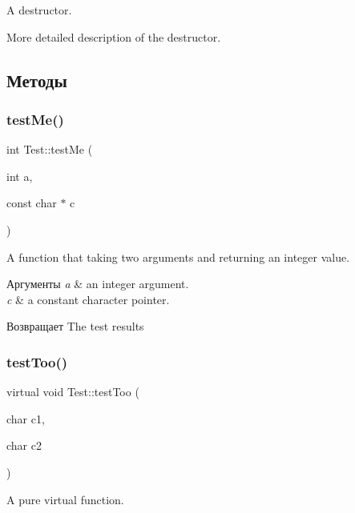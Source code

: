 A destructor. 

More detailed description of the destructor. 

\subsection{Методы}
\hypertarget{class_test_ae41a1e1bd9116e7b8f166500f6d6a38b}{}\label{class_test_ae41a1e1bd9116e7b8f166500f6d6a38b} 
\subsubsection{\texorpdfstring{test\+Me()}{testMe()}}
{\footnotesize\ttfamily int Test\+::test\+Me (\begin{DoxyParamCaption}\item[{int}]{a,  }\item[{const char $\ast$}]{c }\end{DoxyParamCaption})}



A function that taking two arguments and returning an integer value. 


\begin{DoxyParams}{Аргументы}
{\em a} & an integer argument. \\
\hline
{\em c} & a constant character pointer. \\
\hline
\end{DoxyParams}
\begin{DoxyReturn}{Возвращает}
The test results 
\end{DoxyReturn}
\hypertarget{class_test_aebeca5098345184f423cecb03d8cb615}{}\label{class_test_aebeca5098345184f423cecb03d8cb615} 
\subsubsection{\texorpdfstring{test\+Too()}{testToo()}}
{\footnotesize\ttfamily virtual void Test\+::test\+Too (\begin{DoxyParamCaption}\item[{char}]{c1,  }\item[{char}]{c2 }\end{DoxyParamCaption})\hspace{0.3cm}{\ttfamily [pure virtual]}}



A pure virtual function. 


